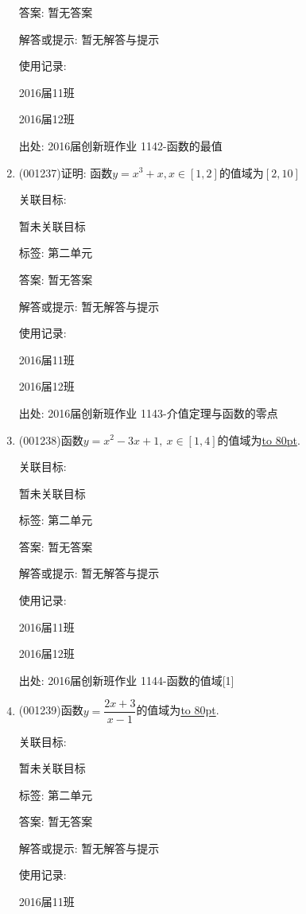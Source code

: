\documentclass[10pt,a4paper]{article}
\newcommand{\blank}[1]{\underline{\hbox to #1pt{}}}
\begin{document}
\begin{enumerate}[1.]
答案: 暂无答案

解答或提示: 暂无解答与提示

使用记录:

2016届11班		

2016届12班		


出处: 2016届创新班作业	1142-函数的最值
\item { (001237)}证明: 函数$y=x^3+x,x\in [1,2]$的值域为$[2,10]$


关联目标:

暂未关联目标



标签: 第二单元

答案: 暂无答案

解答或提示: 暂无解答与提示

使用记录:

2016届11班	

2016届12班	


出处: 2016届创新班作业	1143-介值定理与函数的零点
\item { (001238)}函数$y=x^2-3x+1, \ x \in [1,4]$的值域为\blank{80}.


关联目标:

暂未关联目标



标签: 第二单元

答案: 暂无答案

解答或提示: 暂无解答与提示

使用记录:

2016届11班	

2016届12班	


出处: 2016届创新班作业	1144-函数的值域[1]
\item { (001239)}函数$y=\dfrac{2x+3}{x-1}$的值域为\blank{80}.


关联目标:

暂未关联目标



标签: 第二单元

答案: 暂无答案

解答或提示: 暂无解答与提示

使用记录:

2016届11班	


\end{enumerate}
\end{document}
